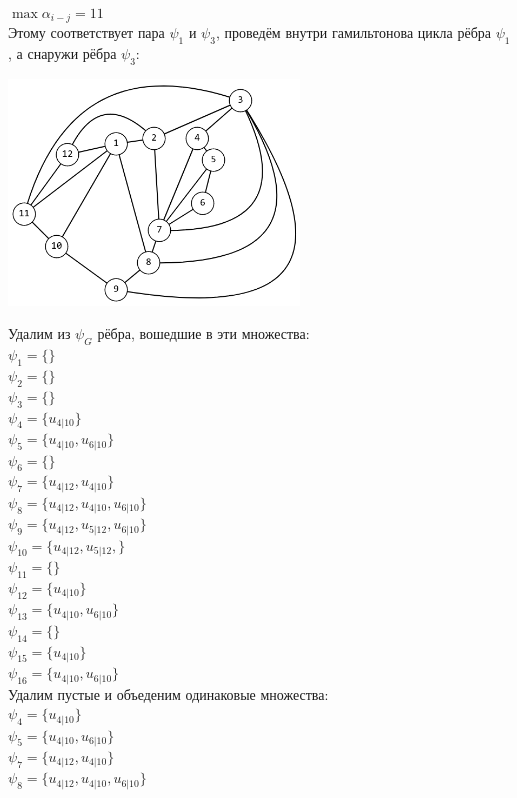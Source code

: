 \documentclass[12pt,a4paper]{report}
\begin{document}
$\max \alpha_{i-j}=11$\\
Этому соответствует пара $\psi_1$ и $\psi_3$, проведём внутри гамильтонова цикла рёбра $\psi_1$, а снаружи рёбра $\psi_3$:
\begin{center}
    \includegraphics[height=6cm]{graph_1.png}
\end{center}
Удалим из $\psi_G$ рёбра, вошедшие в эти множества:\\
$\psi_{1} = \{\}$ \\
$\psi_{2} = \{\}$ \\
$\psi_{3} = \{\}$ \\
$\psi_{4} = \{u_{4 | 10}\}$ \\
$\psi_{5} = \{u_{4 | 10},u_{6 | 10}\}$ \\
$\psi_{6} = \{\}$ \\
$\psi_{7} = \{u_{4 | 12},u_{4 | 10}\}$ \\
$\psi_{8} = \{u_{4 | 12},u_{4 | 10},u_{6 | 10}\}$ \\
$\psi_{9} = \{u_{4 | 12},u_{5 | 12},u_{6 | 10}\}$ \\
$\psi_{10} = \{u_{4 | 12},u_{5 | 12},\}$ \\
$\psi_{11} = \{\}$ \\
$\psi_{12} = \{u_{4 | 10}\}$ \\
$\psi_{13} = \{u_{4 | 10},u_{6 | 10}\}$ \\
$\psi_{14} = \{\}$ \\
$\psi_{15} = \{u_{4 | 10}\}$ \\
$\psi_{16} = \{u_{4 | 10},u_{6 | 10}\}$ \\
Удалим пустые и объеденим одинаковые множества:\\
$\psi_{4} = \{u_{4 | 10}\}$ \\
$\psi_{5} = \{u_{4 | 10},u_{6 | 10}\}$ \\
$\psi_{7} = \{u_{4 | 12},u_{4 | 10}\}$ \\
$\psi_{8} = \{u_{4 | 12},u_{4 | 10},u_{6 | 10}\}$ \\
\end{document}
